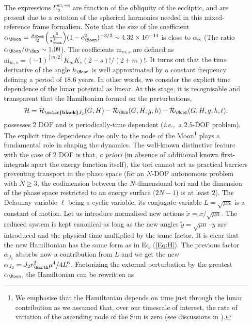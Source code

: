 \documentclass{amsart}
\theoremstyle{definition}
\theoremstyle{remark}
\numberwithin{equation}{section}
\newcommand{\ie}{\textit{i.e.,\ }}
\begin{document}
{\color{black}The expressions $U_{2}^{m,\pm s}$ are function of the obliquity of the {\color{black} eccliptic, and are present due to a rotation of the spherical harmonics needed in this mixed-reference frame formalism}.}
Note that the size of the coefficient 
$\alpha_{\Moon} = \frac{\mu_{\Moon}}{2} \Big(\frac{a^{2}}{a_{\Moon}^{3}}\Big)(1-e_{\Moon}^{2})^{-3/2} \sim 4.32 \times 10^{-14}$ is close to $\alpha_{\Sun}$ (The ratio $\alpha_{\Moon}/\alpha_{\Sun} \sim 1.09$). The coefficients $\textrm{m}_{m,s}$ are defined as $\textrm{m}_{m,s}=(-1)^{[m/2]}K_{m}K_{s} (2-s)!/(2+m)!$.
It turns out that the {\color{black}time derivative} of the angle $h_{\Moon}$ is well approximated by a constant frequency   defining a period of $18.6$ years. In other words, we consider the explicit {\color{black}time dependence} of the lunar potential {\color{black}as linear}. At this stage, it is recognisable and transparent that the Hamiltonian formed  on the perturbations,
\begin{align}\label{Eq:H}
	\mathcal{H} = \mathcal{H}_{\textbf{{\color{black}$J_{2}$}}}(G,H)  -\mathcal{R}_{\Sun}(G,H,g,h)-\mathcal{R}_{\Moon}(G,H,g,h,t), 
\end{align}
{\color{black}possesses $2$ DOF} and is periodically-time dependent (\ie a $2.5$-DOF problem).  The {\color{black}explicit time} dependence {\color{black} due only} to the node of the Moon\footnote{ 
We emphasise that the Hamiltonian depends on time just through the lunar contribution as we assumed that, over our timescale of interest, the rate of variation of the ascending node of the Sun is zero {\color{black}(see discussions in \cite{aCe17})}. 
} plays a fundamental role in shaping the dynamics. 
The well-known distinctive feature with the case of {\color{black}$2$ DOF} is that, \textit{a priori} (in absence of additional known first-integrals {\color{black}apart the energy function itself}), the tori cannot act as  practical barriers preventing transport in the phase space (for an $N$-DOF autonomous problem with $N \ge 3$, the codimension between  the $N$-dimensional tori and the dimension of the {\color{black}phase space} restricted to an {\color{black}energy surface} ($2N-1$) is at least $2$). The Delaunay variable $\ell$ being a cyclic variable, its conjugate variable $L=\sqrt{\mu a}$ is a constant of motion. Let us introduce normalised new actions $\tilde{x}=x / \sqrt{\mu a}$. The {\color{black} reduced} system is kept canonical as long as the new angles $\tilde{y}=\sqrt{\mu a} \cdot y$ are introduced and the physical-time multiplied by the same factor.  
It is clear that the new Hamiltonian has the same form as in Eq.\,(\ref{Eq:H}). The previous factor $\alpha_{J_{2}}$ absorbs now a contribution from $L$ and we get the new  $\alpha_{J_{2}}=J_{2}r_{\Earth}^{2}\mu^{4}/4L^{6}$. Factorizing the external perturbation by the greatest $\alpha_{\Moon}$, the Hamiltonian can be rewritten as
\end{document}
